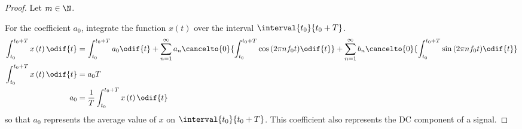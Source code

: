 \documentclass{article}
\begin{document}
\begin{proof}
    Let \(m \in \N\).

    For the coefficient \(a_0\), integrate the function \(x\left( t \right)\) over the interval \(\interval{t_0}{t_0 + T}\).
    \begin{align*}
        \int_{t_0}^{t_0 + T} x\left( t \right) \odif{t} & = \int_{t_0}^{t_0 + T} a_0 \odif{t} + \sum_{n = 1}^\infty a_n \cancelto{0}{\int_{t_0}^{t_0 + T} \cos{\left( 2 \pi n f_0 t \right)} \odif{t}} + \sum_{n = 1}^\infty b_n \cancelto{0}{\int_{t_0}^{t_0 + T} \sin{\left( 2 \pi n f_0 t \right)} \odif{t}} \\
        \int_{t_0}^{t_0 + T} x\left( t \right) \odif{t} & = a_0 T                                                                                                                                                                                                                                               \\
        a_0                                             & = \frac{1}{T} \int_{t_0}^{t_0 + T} x\left( t \right) \odif{t}
    \end{align*}
    so that \(a_0\) represents the average value of \(x\) on \(\interval{t_0}{t_0 + T}\). This coefficient also
    represents the DC component of a signal.


\end{proof}
\end{document}
